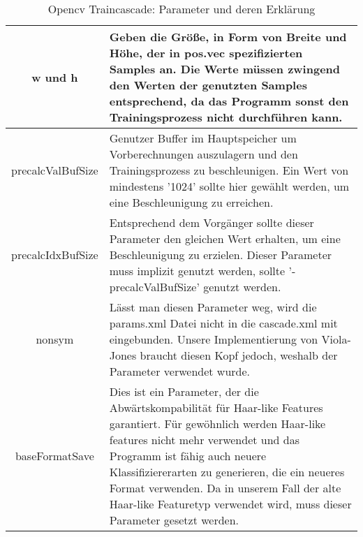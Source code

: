 \begin{table}[H]
\begin{tabularx}{\textwidth}{|c|X|}
\hline
w und h & Geben die Größe, in Form von Breite und Höhe, der in pos.vec spezifizierten Samples an. Die Werte müssen zwingend den Werten der genutzten Samples entsprechend, da das Programm sonst den Trainingsprozess nicht durchführen kann.\\ 
\hline
precalcValBufSize & Genutzer Buffer im Hauptspeicher um Vorberechnungen auszulagern und den Trainingsprozess zu beschleunigen. Ein Wert von mindestens '1024' sollte hier gewählt werden, um eine Beschleunigung zu erreichen.\\ 
\hline
precalcIdxBufSize & Entsprechend dem Vorgänger sollte dieser Parameter den gleichen Wert erhalten, um eine Beschleunigung zu erzielen. Dieser Parameter muss implizit genutzt werden, sollte '-precalcValBufSize' genutzt werden.\\  \hline
nonsym & Lässt man diesen Parameter weg, wird die params.xml Datei nicht in die cascade.xml mit eingebunden. Unsere Implementierung von Viola-Jones braucht diesen Kopf jedoch, weshalb der Parameter verwendet wurde.\\ 
\hline
baseFormatSave & Dies ist ein Parameter, der die Abwärtskompabilität für Haar-like Features garantiert. Für gewöhnlich werden Haar-like features nicht mehr verwendet und das Programm ist fähig auch neuere Klassifiziererarten zu generieren, die ein neueres Format verwenden. Da in unserem Fall der alte Haar-like Featuretyp verwendet wird, muss dieser Parameter gesetzt werden. \\
\hline
\end{tabularx}
\label{tab:traincascade parameters}
\caption{Opencv Traincascade: Parameter und deren Erklärung}
\end{table}
\label{sec:traincascade}
